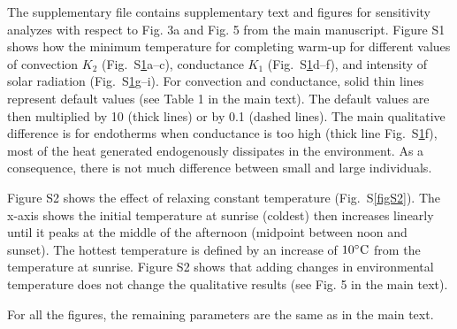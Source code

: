 \documentclass[12pt]{article}
\date{\vspace{-5ex}}
\begin{document}
\maketitle

The supplementary file contains supplementary text and figures for sensitivity analyzes with respect to Fig. 3a and Fig. 5 from the main manuscript.
Figure S1 shows how the minimum temperature for completing warm-up for different values of convection $K_2$ (Fig.~S\ref{figS1}a--c), conductance $K_1$ (Fig.~S\ref{figS1}d--f), and intensity of solar radiation (Fig.~S\ref{figS1}g--i).
For convection and conductance, solid thin lines represent default values (see Table 1 in the main text).
The default values are then multiplied by 10 (thick lines) or by 0.1 (dashed lines).
The main qualitative difference is for endotherms when conductance is too high (thick line Fig.~S\ref{figS1}f), most of the heat generated endogenously dissipates in the environment.
As a consequence, there is not much difference between small and large individuals.

Figure S2  shows the effect of relaxing constant temperature (Fig.~S\ref{figS2}).
The x-axis shows the initial temperature at sunrise (coldest) then increases linearly until it peaks at the middle of the afternoon (midpoint between noon and sunset). The hottest temperature is defined by an increase of $10 ^{\circ}\rm{C}$ from the temperature at sunrise.
Figure S2 shows that adding changes in environmental temperature does not change the qualitative results (see Fig. 5 in the main text).

For all the figures, the remaining parameters are the same as in the main text.

\begin{figure}
	\label{figS1}
\end{figure}
\end{document}
